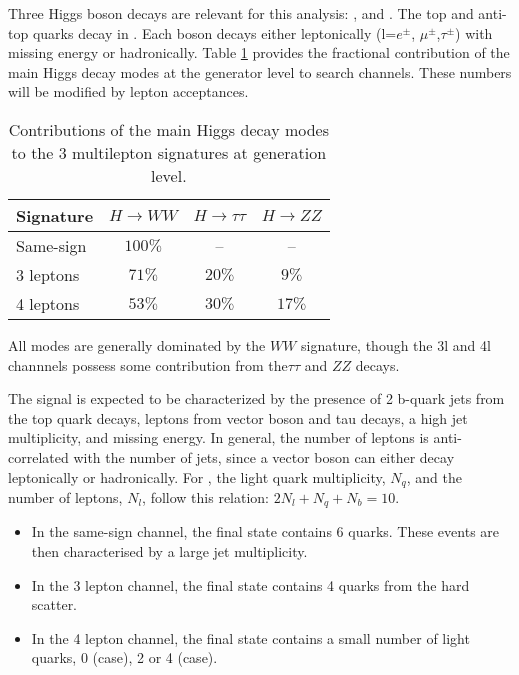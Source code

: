 Three Higgs boson decays are relevant for this analysis: \WW,
\twotau and \ZZ. The top and anti-top quarks decay  in
\Wb. Each \W boson decays either 
leptonically (l=$e^\pm$, $\mu^\pm$,$\tau^\pm$) with missing energy or hadronically. 
Table \ref{ana:table_decay} provides the fractional contribution of the main 
Higgs decay modes at the generator level to \tth search channels. These
numbers will be modified by lepton acceptances. 

\begin{table}[htbp]
  \begin{center} 
    \caption{Contributions of the main Higgs decay modes to the 3 multilepton
      \tth signatures at generation level.
      }\label{ana:table_decay} {\small
    \begin{tabular}{l|c|c|c} 
      \hline\hline
  Signature & $H \rightarrow WW$  & $H\rightarrow \tau\tau$  & $H \rightarrow
  ZZ$  \\\hline
  Same-sign &  $100\%$ & -- & -- \\
  3 leptons  &  $71\%$ & $20\%$ & $9\%$ \\
  4 leptons  &  $53\%$ & $30\%$ & $17\%$  \\
     \hline
    \end{tabular}}
  \end{center}
\end{table}


All modes are generally dominated by the $WW$ signature, though the 3l and 4l
channnels possess some contribution from the$\tau\tau$ and $ZZ$ decays. 


The signal is expected to be characterized by the presence of 2 b-quark jets from
the top quark decays, leptons from vector boson and tau decays,
a high jet multiplicity, and missing energy. In general, the number of leptons is anti-correlated 
with the number of jets, since a vector boson can either decay leptonically 
or hadronically. For \hww, the light quark multiplicity, $N_q$, and the
number of leptons, $N_l$, follow this relation: $2N_l+N_q+N_b=10$.

\begin{itemize}
\item In the same-sign channel, the \tth final state contains 6 quarks. These events
are then characterised by a large jet multiplicity.

\item In the 3 lepton channel, the \tth final state contains 4 quarks from the hard scatter.

\item In the 4 lepton channel, the \tth final state contains a small number of light
quarks, 0 (\hww case), 2 or 4 (\hzz case).


\end{itemize} 

